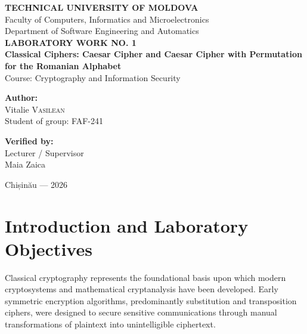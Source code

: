\documentclass[12pt,a4paper]{article}
\newcommand{\studentgroup}{FAF-241} %
\begin{document}
\begin{titlepage}
    \centering
    {\large \textbf{TECHNICAL UNIVERSITY OF MOLDOVA}}\\[0.2cm]
    {\large Faculty of Computers, Informatics and Microelectronics}\\[0.2cm]
    {\large Department of Software Engineering and Automatics}\\[4cm]

    {\Large \textbf{LABORATORY WORK NO. 1}}\\[0.4cm]
    {\LARGE \textbf{Classical Ciphers: Caesar Cipher and Caesar Cipher with Permutation for the Romanian Alphabet}}\\[0.4cm]
    {\large Course: Cryptography and Information Security}\\[4cm]

    \begin{minipage}{0.45\textwidth}
        \flushleft
        \textbf{Author:}\\
        Vitalie \textsc{Vasilean}\\
        Student of group: \studentgroup
    \end{minipage}
    \hfill
    \begin{minipage}{0.45\textwidth}
        \flushright
        \textbf{Verified by:}\\
        Lecturer / Supervisor\\
        Maia Zaica
    \end{minipage}

    \vfill
    {\large Chișinău --- 2026}
\end{titlepage}

\newpage
\tableofcontents
\newpage

\section{Introduction and Laboratory Objectives}

Classical cryptography represents the foundational basis upon which modern cryptosystems and mathematical cryptanalysis have been developed. Early symmetric encryption algorithms, predominantly substitution and transposition ciphers, were designed to secure sensitive communications through manual transformations of plaintext into unintelligible ciphertext.
\end{document}
